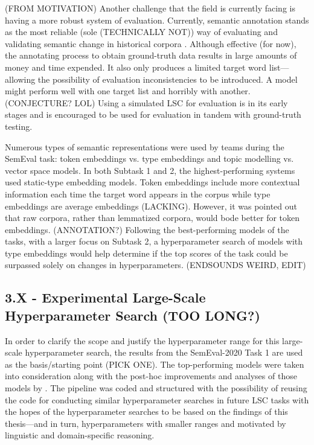 (FROM MOTIVATION)
Another challenge that the field is currently facing is having a more robust system of evaluation. Currently, semantic annotation stands as the most reliable (sole (TECHNICALLY NOT)) way of evaluating and validating semantic change in historical corpora \citep{hengchen2021challenges}. Although effective (for now), the annotating process to obtain ground-truth data results in large amounts of money and time expended. It also only produces a limited target word list—allowing the possibility of evaluation inconsistencies to be introduced. A model might perform well with one target list and horribly with another. (CONJECTURE? LOL) Using a simulated LSC for evaluation is in its early stages and is encouraged to be used for evaluation in tandem with ground-truth testing.

Numerous types of semantic representations were used by teams during the SemEval task: token embeddings vs. type embeddings and topic modelling vs. vector space models. In both Subtask 1 and 2, the highest-performing systems used static-type embedding models. Token embeddings include more contextual information each time the target word appears in the corpus while type embeddings are average embeddings (LACKING). However, it was pointed out that raw corpora, rather than lemmatized corpora, would bode better for token embeddings. (ANNOTATION?) Following the best-performing models of the tasks, with a larger focus on Subtask 2, a hyperparameter search of models with type embeddings would help determine if the top scores of the task could be surpassed solely on changes in hyperparameters. (ENDSOUNDS WEIRD, EDIT) 

\subsection{3.X - Experimental Large-Scale Hyperparameter Search (TOO LONG?)}
In order to clarify the scope and justify the hyperparameter range for this large-scale hyperparameter search, the results from the SemEval-2020 Task 1 are used as the basis/starting point (PICK ONE). The top-performing models were taken into consideration along with the post-hoc improvements and analyses of those models by \citet{kaiser-etal-2020-ims}. The pipeline was coded and structured with the possibility of reusing the code for conducting similar hyperparameter searches in future LSC tasks with the hopes of the hyperparameter searches to be based on the findings of this thesis—and in turn, hyperparameters with smaller ranges and motivated by linguistic and domain-specific reasoning. 

